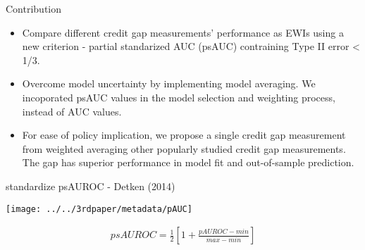 \documentclass[
  ignorenonframetext,
]{beamer}
\providecommand{\tightlist}{%
  \setlength{\itemsep}{0pt}\setlength{\parskip}{0pt}}
\begin{document}
\begin{frame}{Contribution}
\protect\hypertarget{contribution-3}{}
\begin{itemize}
\tightlist
\item
  Compare different credit gap measurements' performance as EWIs using a
  new criterion - partial standarized AUC (psAUC) contraining Type II
  error \textless{} 1/3.
\item
  Overcome model uncertainty by implementing model averaging. We
  incoporated psAUC values in the model selection and weighting process,
  instead of AUC values.
\item
  For ease of policy implication, we propose a single credit gap
  measurement from weighted averaging other popularly studied credit gap
  measurements. The gap has superior performance in model fit and
  out-of-sample prediction.
\end{itemize}
\end{frame}

\begin{frame}{standardize psAUROC - Detken (2014)}
\protect\hypertarget{standardize-psauroc---detken-2014}{}
\begin{center}\texttt{[image: ../../3rdpaper/metadata/pAUC]} \end{center}

\begin{align}
psAUROC = \frac{1}{2}\left[ 1+ \frac{pAUROC - min}{max - min}\right]
\end{align}
\end{frame}
\end{document}
